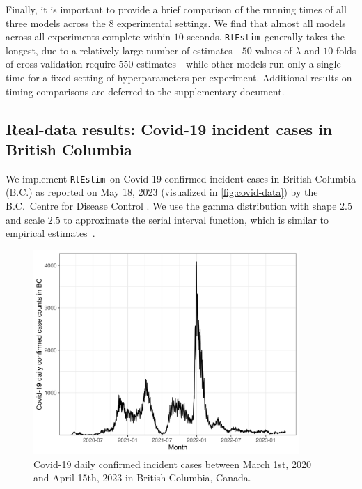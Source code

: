 \documentclass[10pt,letterpaper]{article}
\def\RtEstim{\texttt{RtEstim}}
\newcommand{\citep}[1]{\cite{#1}}
\begin{document}
Finally, it is important to provide a brief comparison of the running times of
all three models across the $8$ experimental settings. We find that almost all
models across all experiments complete within $10$ seconds. \RtEstim\ generally
takes the longest, due to a relatively large number of estimates---$50$ values
of $\lambda$ and $10$ folds of cross validation require $550$ estimates---while
other models run only a single time for a fixed setting of hyperparameters per
experiment. Additional results on timing comparisons are deferred to the
supplementary document. 


\subsection{Real-data results: Covid-19 incident cases in British Columbia}

We implement \RtEstim\ on Covid-19 confirmed incident cases in British Columbia
(B.C.) as reported on May 18, 2023 (visualized in \autoref{fig:covid-data}) by
the B.C.\ Centre for Disease Control \citep{covidbc}. We use the gamma distribution with shape
$2.5$ and scale $2.5$ to approximate the serial interval function, which is
similar to empirical estimates~\citep{lehtinen2021relationship}. 

\begin{figure}[!ht]
  \centering
  \includegraphics[width=0.9\textwidth]{fig/covid_dat.png}
  \caption{Covid-19 daily confirmed incident cases between March 1st, 
  2020 and April 15th, 2023 in British Columbia, Canada.} 
  \label{fig:covid-data}
\end{figure} 
\end{document}
